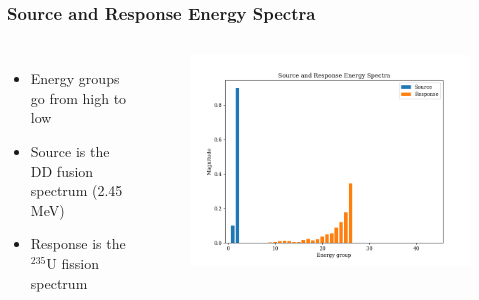 \documentclass[t]{beamer}
\newcommand{\tildecenter}{\raisebox{0.5ex}{\texttildelow}}
\begin{document}
\begin{frame}
  \frametitle{Source and Response Energy Spectra}
  \begin{columns}[c]
    \begin{itemize}
      \item Energy groups go from high to low
      \item Source is the DD fusion spectrum (\tildecenter 2.45 MeV)
      \item Response is the ${}^{235}\text{U}$ fission spectrum
    \end{itemize}
    \begin{figure}
      \includegraphics[trim={0.4in 0.2in 0.75in 0.4in},clip,scale=0.45]{images/spectra_lin.png}
    \end{figure}
  \end{columns}
\end{frame}
\end{document}
